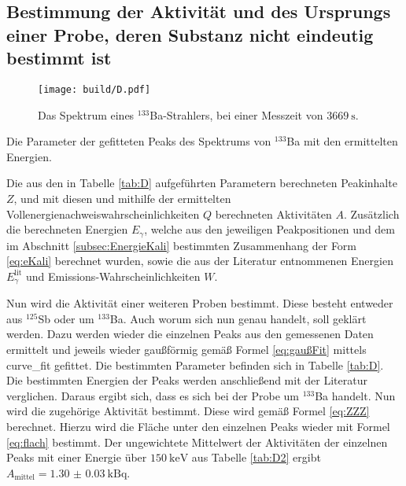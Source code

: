 \subsection{Bestimmung der Aktivität und des Ursprungs einer Probe, deren Substanz nicht eindeutig bestimmt ist}
\begin{figure}
	\centering
	\texttt{[image: build/D.pdf]}
	\caption{Das Spektrum eines $^{133}$Ba-Strahlers, bei einer Messzeit von $\SI{3669}{\second}$.}
	\label{fig:3}
\end{figure}
\begin{table}
	\centering
	\caption{Die Parameter der gefitteten Peaks des Spektrums von $^{133}$Ba mit den ermittelten Energien.}
	
\end{table}
\begin{table}
	\centering
	\caption{Die aus den in Tabelle \ref{tab:D} aufgeführten Parametern berechneten Peakinhalte $Z$, und mit diesen und mithilfe der ermittelten Vollenergienachweiswahrscheinlichkeiten $Q$ berechneten Aktivitäten $A$. Zusätzlich die berechneten Energien $E_\gamma$, welche aus den jeweiligen Peakpositionen und dem im Abschnitt \ref{subsec:EnergieKali} bestimmten Zusammenhang der Form \eqref{eq:eKali} berechnet wurden, sowie die aus der Literatur entnommenen Energien $E_\gamma^\text{lit}$ und Emissions-Wahrscheinlichkeiten $W$.}
	
\end{table}
Nun wird die Aktivität einer weiteren Proben bestimmt. Diese besteht entweder aus $^{125}$Sb oder um $^{133}$Ba. Auch worum sich nun genau handelt, soll geklärt werden. Dazu werden wieder die einzelnen Peaks aus den gemessenen Daten ermittelt und jeweils wieder gaußförmig gemäß Formel \eqref{eq:gaußFit} mittels curve\_fit \cite{scipy} gefittet. Die bestimmten Parameter befinden sich in Tabelle \ref{tab:D}. Die bestimmten Energien der Peaks werden anschließend mit der Literatur \cite{KHAZOV2011855} verglichen. Daraus ergibt sich, dass es sich bei der Probe um $^{133}$Ba handelt. Nun wird die zugehörige Aktivität bestimmt. Diese wird gemäß Formel \eqref{eq:ZZZ} berechnet. Hierzu wird die Fläche unter den einzelnen Peaks wieder mit Formel \eqref{eq:flach} bestimmt. Der ungewichtete Mittelwert der Aktivitäten der einzelnen Peaks mit einer Energie über $\SI{150}{\kilo\electronvolt}$ aus Tabelle \ref{tab:D2} ergibt $A_\text{mittel} = \SI{1.30(3)}{\kilo\becquerel}$.



